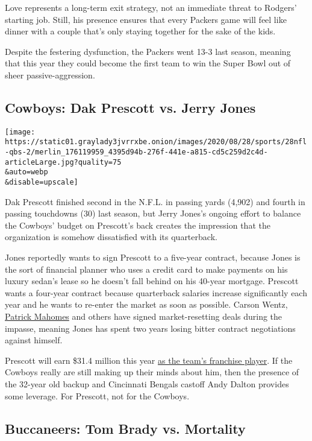 Love represents a long-term exit strategy, not an immediate threat to
Rodgers' starting job. Still, his presence ensures that every Packers
game will feel like dinner with a couple that's only staying together
for the sake of the kids.

Despite the festering dysfunction, the Packers went 13-3 last season,
meaning that this year they could become the first team to win the Super
Bowl out of sheer passive-aggression.

\hypertarget{cowboys-dak-prescott-vs-jerry-jones}{%
\subsection{Cowboys: Dak Prescott vs. Jerry
Jones}\label{cowboys-dak-prescott-vs-jerry-jones}}

\texttt{[image: https://static01.graylady3jvrrxbe.onion/images/2020/08/28/sports/28nfl-qbs-2/merlin\_176119959\_4395d94b-276f-441e-a815-cd5c259d2c4d-articleLarge.jpg?quality=75\\\&auto=webp\\\&disable=upscale]}

Dak Prescott finished second in the N.F.L. in passing yards (4,902) and
fourth in passing touchdowns (30) last season, but Jerry Jones's ongoing
effort to balance the Cowboys' budget on Prescott's back creates the
impression that the organization is somehow dissatisfied with its
quarterback.

Jones reportedly wants to sign Prescott to a five-year contract, because
Jones is the sort of financial planner who uses a credit card to make
payments on his luxury sedan's lease so he doesn't fall behind on his
40-year mortgage. Prescott wants a four-year contract because
quarterback salaries increase significantly each year and he wants to
re-enter the market as soon as possible. Carson Wentz,
\href{https://www.nytimes3xbfgragh.onion/2020/07/06/sports/football/pat-mahomes-contract.html}{Patrick
Mahomes} and others have signed market-resetting deals during the
impasse, meaning Jones has spent two years losing bitter contract
negotiations against himself.

Prescott will earn \$31.4 million this year
\href{https://www.nytimes3xbfgragh.onion/2020/07/16/sports/football/franchise-tag-dak-prescott.html}{as
the team's franchise player}. If the Cowboys really are still making up
their minds about him, then the presence of the 32-year old backup and
Cincinnati Bengals castoff Andy Dalton provides some leverage. For
Prescott, not for the Cowboys.

\hypertarget{buccaneers-tom-brady-vs-mortality}{%
\subsection{Buccaneers: Tom Brady vs.
Mortality}\label{buccaneers-tom-brady-vs-mortality}}

